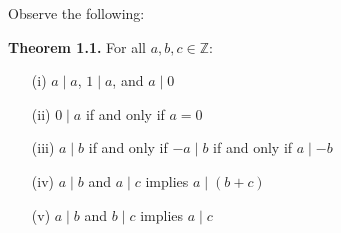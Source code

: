 \newpage

\noindent
Observe the following:
\begin{theo}

    \textbf{Theorem 1.1.} For all $a, b, c \in \mathbb{Z}$:

    \begin{itemize}
        \item[(i)] $a \mid a$, $1 \mid a$, and $a \mid 0$
        \item[(ii)] $0 \mid a$ if and only if $a = 0$
        \item[(iii)] $a \mid b$ if and only if $-a \mid b$ if and only if $a \mid -b$
        \item[(iv)] $a \mid b$ and $a \mid c$ implies $a \mid (b + c)$
        \item[(v)] $a \mid b$ and $b \mid c$ implies $a \mid c$
    \end{itemize}
\end{theo}

